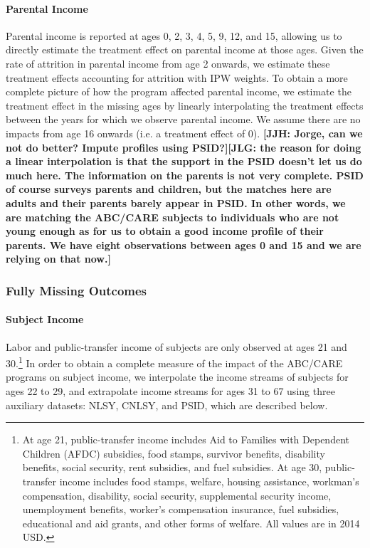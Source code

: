 \paragraph{Parental Income}

\noindent Parental income is reported at ages 0, 2, 3, 4, 5, 9, 12, and 15, allowing us to directly estimate
the treatment effect on parental income at those ages. Given the rate of attrition in
parental income from age 2 onwards, we estimate these treatment effects accounting for attrition
with IPW weights.
To obtain a more complete picture of how the
program affected parental income, we estimate the treatment effect in the missing ages by linearly
interpolating the treatment effects between the years for which we observe parental income. We assume
there are no impacts from age 16 onwards (i.e. a treatment effect of 0). \textbf{[JJH: Jorge, can we not do better? Impute profiles using PSID?]}\textbf{[JLG: the reason for doing a linear interpolation is that the support in the PSID doesn't let us do much here. The information on the parents is not very complete. PSID of course surveys parents and children, but the matches here are adults and their parents barely appear in PSID. In other words, we are matching the ABC/CARE subjects to individuals who are not young enough as for us to obtain a good income profile of their parents.  We have eight observations between ages 0 and 15 and we are relying on that now.]} \\


\subsubsection{Fully Missing Outcomes}
\label{app:method_noobs}

\paragraph{Subject Income}

\noindent Labor and public-transfer income of subjects are only observed at ages 21 and 30.\footnote{At age 21, public-transfer income includes Aid to
Families with Dependent Children (AFDC) subsidies, food stamps, survivor benefits, disability
benefits, social security, rent subsidies, and fuel subsidies. At age 30, public-transfer income includes food stamps, welfare, housing assistance, workman's
compensation, disability, social security, supplemental security income, unemployment benefits,
worker's compensation insurance, fuel subsidies, educational and aid grants, and other forms of welfare. All values are in 2014 USD.} In order to obtain a complete measure of the impact of the ABC/CARE programs on subject income, we interpolate the income streams of subjects for ages 22 to 29, and extrapolate income streams for ages 31 to 67 using three auxiliary datasets: NLSY, CNLSY, and PSID, which are described below. \\

